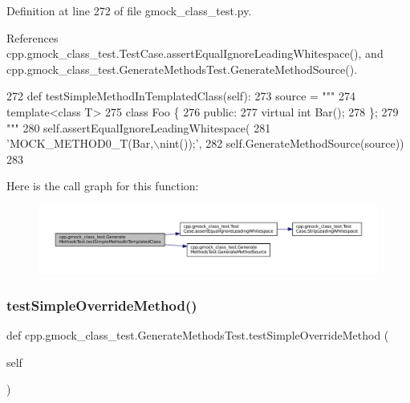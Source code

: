 Definition at line 272 of file gmock\+\_\+class\+\_\+test.\+py.



References cpp.\+gmock\+\_\+class\+\_\+test.\+Test\+Case.\+assert\+Equal\+Ignore\+Leading\+Whitespace(), and cpp.\+gmock\+\_\+class\+\_\+test.\+Generate\+Methods\+Test.\+Generate\+Method\+Source().


\begin{DoxyCode}
272   \textcolor{keyword}{def }testSimpleMethodInTemplatedClass(self):
273     source = \textcolor{stringliteral}{"""}
274 \textcolor{stringliteral}{template<class T>}
275 \textcolor{stringliteral}{class Foo \{}
276 \textcolor{stringliteral}{ public:}
277 \textcolor{stringliteral}{  virtual int Bar();}
278 \textcolor{stringliteral}{\};}
279 \textcolor{stringliteral}{"""}
280     self.assertEqualIgnoreLeadingWhitespace(
281         \textcolor{stringliteral}{'MOCK\_METHOD0\_T(Bar,\(\backslash\)nint());'},
282         self.GenerateMethodSource(source))
283 
\end{DoxyCode}
Here is the call graph for this function\+:
\nopagebreak
\begin{figure}[H]
\begin{center}
\leavevmode
\includegraphics[width=350pt]{classcpp_1_1gmock__class__test_1_1GenerateMethodsTest_a964a1b55f2096edf7a6165734b1f0619_cgraph}
\end{center}
\end{figure}
\mbox{\label{classcpp_1_1gmock__class__test_1_1GenerateMethodsTest_a2b1501cf9517acbeb48d11e9d8992a9b}} 
\subsubsection{\texorpdfstring{test\+Simple\+Override\+Method()}{testSimpleOverrideMethod()}}
{\footnotesize\ttfamily def cpp.\+gmock\+\_\+class\+\_\+test.\+Generate\+Methods\+Test.\+test\+Simple\+Override\+Method (\begin{DoxyParamCaption}\item[{}]{self }\end{DoxyParamCaption})}



